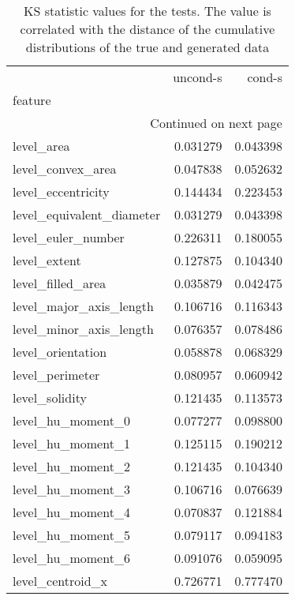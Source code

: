 \begin{longtable}{lrr}
	\caption[KS statistic values]{ \small KS statistic values for the tests. The value is correlated with the distance of the cumulative distributions of the true and generated data}\\
	\toprule
	{} &  uncond-s &    cond-s \\
	feature                       &           &           \\
	\midrule
	\endhead
	\midrule
	\multicolumn{3}{r}{{Continued on next page}} \\
	\midrule
	\endfoot
	
	\bottomrule
	\endlastfoot
	level\_area                    &  0.031279 &  0.043398 \\
	level\_convex\_area             &  0.047838 &  0.052632 \\
	level\_eccentricity            &  0.144434 &  0.223453 \\
	level\_equivalent\_diameter     &  0.031279 &  0.043398 \\
	level\_euler\_number            &  0.226311 &  0.180055 \\
	level\_extent                  &  0.127875 &  0.104340 \\
	level\_filled\_area             &  0.035879 &  0.042475 \\
	level\_major\_axis\_length       &  0.106716 &  0.116343 \\
	level\_minor\_axis\_length       &  0.076357 &  0.078486 \\
	level\_orientation             &  0.058878 &  0.068329 \\
	level\_perimeter               &  0.080957 &  0.060942 \\
	level\_solidity                &  0.121435 &  0.113573 \\
	level\_hu\_moment\_0             &  0.077277 &  0.098800 \\
	level\_hu\_moment\_1             &  0.125115 &  0.190212 \\
	level\_hu\_moment\_2             &  0.121435 &  0.104340 \\
	level\_hu\_moment\_3             &  0.106716 &  0.076639 \\
	level\_hu\_moment\_4             &  0.070837 &  0.121884 \\
	level\_hu\_moment\_5             &  0.079117 &  0.094183 \\
	level\_hu\_moment\_6             &  0.091076 &  0.059095 \\
	level\_centroid\_x              &  0.726771 &  0.777470 \\

\end{longtable}
